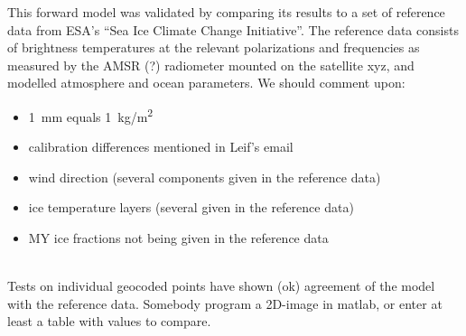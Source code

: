 \documentclass[11pt, a4paper]{article}
\begin{document}
This forward model was validated by comparing its results to a set of reference data from ESA's ``Sea Ice Climate Change Initiative''. The reference data consists of brightness temperatures at the relevant polarizations and frequencies as measured by the AMSR (?) radiometer mounted on the satellite xyz, and modelled atmosphere and ocean parameters. We should comment upon:

\begin{itemize}
\item \SI{1}{mm} equals \SI{1}{kg/m^2}
\item calibration differences mentioned in Leif's email
\item wind direction (several components given in the reference data)
\item ice temperature layers (several given in the reference data)
\item MY ice fractions not being given in the reference data
\end{itemize}


\ \\
Tests on individual geocoded points have shown (ok) agreement of the model with the reference data. Somebody program a 2D-image in matlab, or enter at least a table with values to compare.
\end{document}
